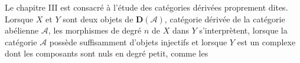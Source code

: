 Le chapitre III est consacré à l'étude des catégories dérivées proprement
dites. Lorsque $X$ et $Y$ sont deux objets de $\mathbf D(\mathcal A)$,
catégorie dérivée de la catégorie abélienne $\mathcal A$, les morphismes de
degré $n$ de $X$ dans $Y$ s'interprètent, lorsque la catégorie $\mathcal A$
possède suffisamment d'objets injectifs et lorsque $Y$ est un complexe dont
les composants sont nuls en degré petit, comme les

